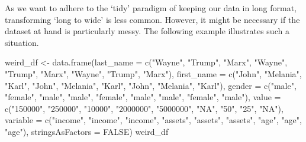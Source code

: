 \documentclass[
  12pt,
]{style/krantz}
\newenvironment{Shaded}{\begin{snugshade}}{\end{snugshade}}
\newcommand{\AttributeTok}[1]{\textcolor[rgb]{0.77,0.63,0.00}{#1}}
\newcommand{\ConstantTok}[1]{\textcolor[rgb]{0.00,0.00,0.00}{#1}}
\newcommand{\FunctionTok}[1]{\textcolor[rgb]{0.00,0.00,0.00}{#1}}
\newcommand{\NormalTok}[1]{#1}
\newcommand{\OtherTok}[1]{\textcolor[rgb]{0.56,0.35,0.01}{#1}}
\newcommand{\StringTok}[1]{\textcolor[rgb]{0.31,0.60,0.02}{#1}}
\begin{document}
As we want to adhere to the `tidy' paradigm of keeping our data in long format, transforming `long to wide' is less common. However, it might be necessary if the dataset at hand is particularly messy. The following example illustrates such a situation.

\begin{Shaded}
\begin{Highlighting}[]
\NormalTok{weird\_df }\OtherTok{\textless{}{-}} \FunctionTok{data.frame}\NormalTok{(}\AttributeTok{last\_name =} \FunctionTok{c}\NormalTok{(}\StringTok{"Wayne"}\NormalTok{, }\StringTok{"Trump"}\NormalTok{, }\StringTok{"Marx"}\NormalTok{,}
                                     \StringTok{"Wayne"}\NormalTok{, }\StringTok{"Trump"}\NormalTok{, }\StringTok{"Marx"}\NormalTok{,}
                                     \StringTok{"Wayne"}\NormalTok{, }\StringTok{"Trump"}\NormalTok{, }\StringTok{"Marx"}\NormalTok{),}
                       \AttributeTok{first\_name =} \FunctionTok{c}\NormalTok{(}\StringTok{"John"}\NormalTok{, }\StringTok{"Melania"}\NormalTok{, }\StringTok{"Karl"}\NormalTok{,}
                                      \StringTok{"John"}\NormalTok{, }\StringTok{"Melania"}\NormalTok{, }\StringTok{"Karl"}\NormalTok{,}
                                      \StringTok{"John"}\NormalTok{, }\StringTok{"Melania"}\NormalTok{, }\StringTok{"Karl"}\NormalTok{),}
                       \AttributeTok{gender =} \FunctionTok{c}\NormalTok{(}\StringTok{"male"}\NormalTok{, }\StringTok{"female"}\NormalTok{, }\StringTok{"male"}\NormalTok{,}
                                  \StringTok{"male"}\NormalTok{, }\StringTok{"female"}\NormalTok{, }\StringTok{"male"}\NormalTok{,}
                                  \StringTok{"male"}\NormalTok{, }\StringTok{"female"}\NormalTok{, }\StringTok{"male"}\NormalTok{),}
                       \AttributeTok{value =} \FunctionTok{c}\NormalTok{(}\StringTok{"150000"}\NormalTok{, }\StringTok{"250000"}\NormalTok{, }\StringTok{"10000"}\NormalTok{,}
                                 \StringTok{"2000000"}\NormalTok{, }\StringTok{"5000000"}\NormalTok{, }\StringTok{"NA"}\NormalTok{,}
                                 \StringTok{"50"}\NormalTok{, }\StringTok{"25"}\NormalTok{, }\StringTok{"NA"}\NormalTok{),}
                       \AttributeTok{variable =} \FunctionTok{c}\NormalTok{(}\StringTok{"income"}\NormalTok{, }\StringTok{"income"}\NormalTok{, }\StringTok{"income"}\NormalTok{,}
                                    \StringTok{"assets"}\NormalTok{, }\StringTok{"assets"}\NormalTok{, }\StringTok{"assets"}\NormalTok{,}
                                    \StringTok{"age"}\NormalTok{, }\StringTok{"age"}\NormalTok{, }\StringTok{"age"}\NormalTok{),}
                       \AttributeTok{stringsAsFactors =} \ConstantTok{FALSE}\NormalTok{)}
\NormalTok{weird\_df}
\end{Highlighting}
\end{Shaded}
\end{document}
